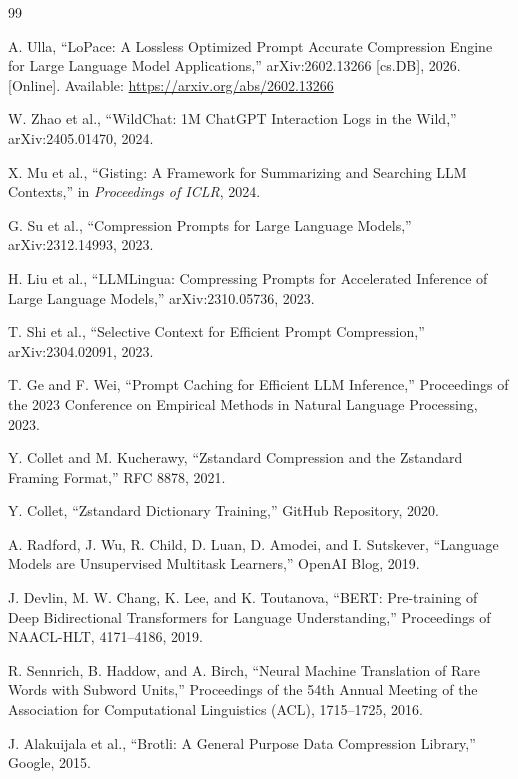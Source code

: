 \documentclass[10pt,conference]{IEEEtran}
\begin{document}
\begin{thebibliography}{99}

 A. Ulla, ``LoPace: A Lossless Optimized Prompt Accurate Compression Engine for Large Language Model Applications,'' arXiv:2602.13266 [cs.DB], 2026. [Online]. Available: \url{https://arxiv.org/abs/2602.13266}

 W. Zhao et al., ``WildChat: 1M ChatGPT Interaction Logs in the Wild,'' arXiv:2405.01470, 2024.

 X. Mu et al., ``Gisting: A Framework for Summarizing and Searching LLM Contexts,'' in \textit{Proceedings of ICLR}, 2024.

 G. Su et al., ``Compression Prompts for Large Language Models,'' arXiv:2312.14993, 2023.

 H. Liu et al., ``LLMLingua: Compressing Prompts for Accelerated Inference of Large Language Models,'' arXiv:2310.05736, 2023.

 T. Shi et al., ``Selective Context for Efficient Prompt Compression,'' arXiv:2304.02091, 2023.

 T. Ge and F. Wei, ``Prompt Caching for Efficient LLM Inference,'' Proceedings of the 2023 Conference on Empirical Methods in Natural Language Processing, 2023.

 Y. Collet and M. Kucherawy, ``Zstandard Compression and the Zstandard Framing Format,'' RFC 8878, 2021.

 Y. Collet, ``Zstandard Dictionary Training,'' GitHub Repository, 2020.

 A. Radford, J. Wu, R. Child, D. Luan, D. Amodei, and I. Sutskever, ``Language Models are Unsupervised Multitask Learners,'' OpenAI Blog, 2019.

 J. Devlin, M. W. Chang, K. Lee, and K. Toutanova, ``BERT: Pre-training of Deep Bidirectional Transformers for Language Understanding,'' Proceedings of NAACL-HLT, 4171--4186, 2019.

 R. Sennrich, B. Haddow, and A. Birch, ``Neural Machine Translation of Rare Words with Subword Units,'' Proceedings of the 54th Annual Meeting of the Association for Computational Linguistics (ACL), 1715--1725, 2016.

 J. Alakuijala et al., ``Brotli: A General Purpose Data Compression Library,'' Google, 2015.


\end{thebibliography}
\end{document}
